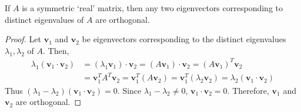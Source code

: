\begin{theorem}
	If $A$ is a symmetric `real' matrix, then any two eigenvectors corresponding to distinct eigenvalues of $A$ are orthogonal.
\end{theorem}
\begin{proof}
	Let $\textbf{v}_1$ and $\textbf{v}_2$ be eigenvectors corresponding to the distinct eigenvalues $\lambda_1, \lambda_2$ of $A$. Then, \begin{align*}
		\lambda_1(\textbf{v}_1 \cdot \textbf{v}_2) &= (\lambda_1\textbf{v}_1) \cdot \textbf{v}_2 = (A\textbf{v}_1) \cdot \textbf{v}_2 = (A\textbf{v}_1)^T\textbf{v}_2 \\
		&= \textbf{v}_1^TA^T\textbf{v}_2 = \textbf{v}_1^T(A\textbf{v}_2) = \textbf{v}_1^T(\lambda_2\textbf{v}_2) = \lambda_2(\textbf{v}_1 \cdot \textbf{v}_2)
	\end{align*}
	Thus $(\lambda_1 - \lambda_2)(\textbf{v}_1 \cdot \textbf{v}_2) = 0$. Since $\lambda_1 - \lambda_2 \neq 0$, $\textbf{v}_1 \cdot \textbf{v}_2 = 0$. Therefore, $\textbf{v}_1$ and $\textbf{v}_2$ are orthogonal.
\end{proof}

